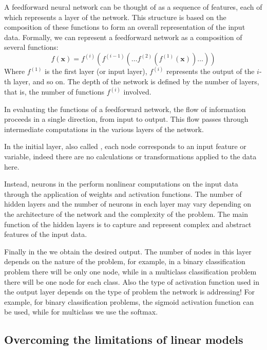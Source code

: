 A feedforward neural network can be thought of as a sequence of features, each of which represents a layer of the network. This structure is based on the composition of these functions to form an overall representation of the input data. Formally, we can represent a feedforward network as a composition of several functions:
$$ f(\mathbf{x}) = f^{(i)}(f^{(i-1)}(\dots f^{(2)}(f^{(1)}(\mathbf{x})) \dots )) $$  
Where \( f^{(1)} \) is the first layer (or input layer), \( f^{(i)} \) represents the output of the \(i\)-th layer, and so on. The depth of the network is defined by the number of layers, that is, the number of functions \( f^{(i)} \) involved.

In evaluating the functions of a feedforward network, the flow of information proceeds in a single direction, from input to output. This flow passes through intermediate computations in the various layers of the network. 

In the initial layer, also called \textbf{\color{green!60!black}{\inconsolatafontfamily Input Layer}}, each node corresponds to an input feature or variable, indeed there are no calculations or transformations applied to the data here.

Instead, neurons in the \textbf{\color{myblue!80!black}{\inconsolatafontfamily Hidden Layers}} perform nonlinear computations on the input data through the application of weights and activation functions.
The number of hidden layers and the number of neurons in each layer may vary depending on the architecture of the network and the complexity of the problem.
The main function of the hidden layers is to capture and represent complex and abstract features of the input data.

Finally in the \textbf{\color{red!80!black}{\inconsolatafontfamily Output Layer}} we obtain the desired output.
The number of nodes in this layer depends on the nature of the problem, for example, in a binary classification problem there will be only one node, while in a multiclass classification problem there will be one node for each class.
Also the type of activation function used in the output layer depends on the type of problem the network is addressing! For example, for binary classification problems, the sigmoid activation function can be used, while for multiclass we use the softmax.

\subsection{Overcoming the limitations of linear models}

